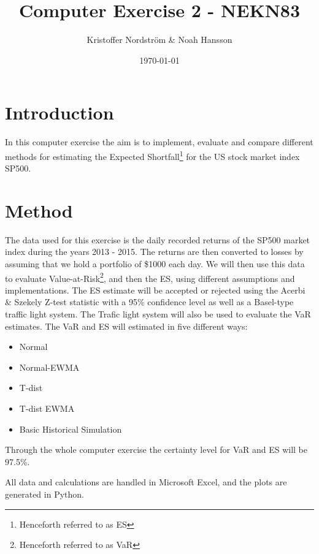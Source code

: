\documentclass[a4paper]{article}
\title{Computer Exercise 2 - NEKN83}
\author{Kristoffer Nordström \& Noah Hansson}
\date{\today}
\begin{document}
\maketitle


\section{Introduction}
In this computer exercise the aim is to implement, evaluate and compare different methods for estimating the Expected Shortfall\footnote{Henceforth referred to as ES} for the US stock market index SP500.

\section{Method}
The data used for this exercise is the daily recorded returns of the SP500 market index during the years 2013 - 2015. The returns are then converted to losses by assuming that we hold a portfolio of \$1000 each day. We will then use this data to evaluate Value-at-Risk\footnote{Henceforth referred to as VaR}, and then the ES, using different assumptions and implementations. The ES estimate will be accepted or rejected using the Acerbi \& Szekely Z-test statistic with a 95\% confidence level as well as a Basel-type traffic light system. The Trafic light system will also be used to evaluate the VaR estimates. The VaR and ES will estimated in five different ways:
\begin{itemize}
    \item Normal
    \item Normal-EWMA
    \item T-dist
    \item T-dist EWMA
    \item Basic Historical Simulation
\end{itemize}
Through the whole computer exercise the certainty level for VaR and ES will be 97.5\%. 

All data and calculations are handled in Microsoft Excel, and the plots are generated in Python.
\end{document}
